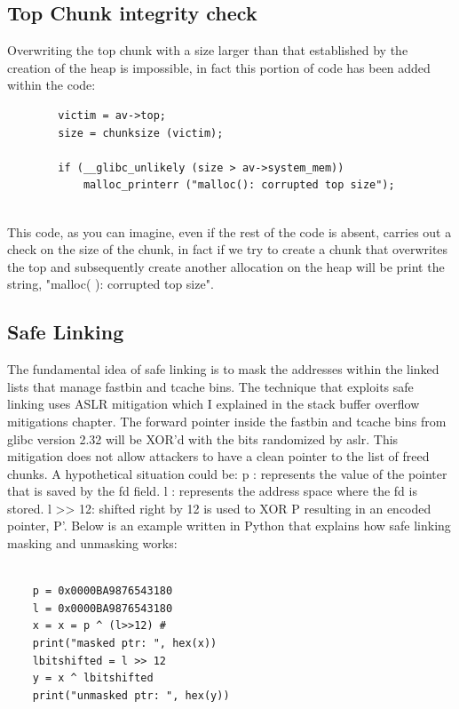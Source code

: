 \documentclass{report}
\begin{document}
    \subsection{Top Chunk integrity check}
    Overwriting the top chunk with a size larger than that established by the creation of the heap is impossible, in fact this portion of code has been added within the code:\newline
    \begin{verbatim}
        victim = av->top;
        size = chunksize (victim);
    
        if (__glibc_unlikely (size > av->system_mem))
            malloc_printerr ("malloc(): corrupted top size");
  
    \end{verbatim}
    This code, as you can imagine, even if the rest of the code is absent, carries out a check on the size of the chunk, in fact if we try to create a chunk that overwrites the top and subsequently create another allocation on the heap will be print the string, "malloc( ): corrupted top size".
    \subsection{Safe Linking}
    The fundamental idea of safe linking is to mask the addresses within the linked lists that manage fastbin and tcache bins.\newline
    The technique that exploits safe linking uses ASLR mitigation which I explained in the stack buffer overflow mitigations chapter.\newline
    The forward pointer inside the fastbin and tcache bins from glibc version 2.32 will be XOR'd with the bits randomized by aslr.
    This mitigation does not allow attackers to have a clean pointer to the list of freed chunks.
    A hypothetical situation could be: \newline
    p : represents the value of the pointer that is saved by the fd field.\newline
    l : represents the address space where the fd is stored.\newline
    l >> 12:  shifted right by 12 is used to XOR P resulting in an encoded pointer, P'.\newline
    Below is an example written in Python that explains how safe linking masking and unmasking works: \newline
    \clearpage
    \begin{verbatim}

    p = 0x0000BA9876543180
    l = 0x0000BA9876543180
    x = x = p ^ (l>>12) # 
    print("masked ptr: ", hex(x))
    lbitshifted = l >> 12 
    y = x ^ lbitshifted
    print("unmasked ptr: ", hex(y))
    \end{verbatim}
    
\end{document}
